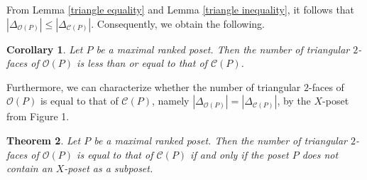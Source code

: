 \documentclass[12pt]{amsart}
\def\Oc{{\mathcal O}}
\def\Cc{{\mathcal C}}
\newtheorem{Theorem}{Theorem}[section]
\newtheorem{Corollary}[Theorem]{Corollary}
\theoremstyle{definition}
\begin{document}
\medskip
From Lemma \ref{triangle equality} and Lemma \ref{triangle inequality}, it follows that $|\Delta_{\mathcal{O}(P)}| \leq |\Delta_{\mathcal{C}(P)}|$.
Consequently, we obtain the following.

\begin{Corollary}
Let $P$ be a maximal ranked poset.
Then the number of triangular $2$-faces of $\mathcal{O}(P)$ is less than or equal to that of $\mathcal{C}(P)$.
\end{Corollary}

Furthermore, we can characterize whether the number of triangular $2$-faces of $\Oc(P)$ is equal to that of $\Cc(P)$, namely $|\Delta_{\mathcal{O}(P)}| = |\Delta_{\mathcal{C}(P)}|$, by the $X$-poset from Figure 1.

\begin{Theorem}\label{main}
Let $P$ be a maximal ranked poset.
Then the number of triangular $2$-faces of $\mathcal{O}(P)$ is equal to that of $\mathcal{C}(P)$ if and only if the poset $P$ does not contain an $X$-poset as a subposet.
\end{Theorem}
\end{document}
